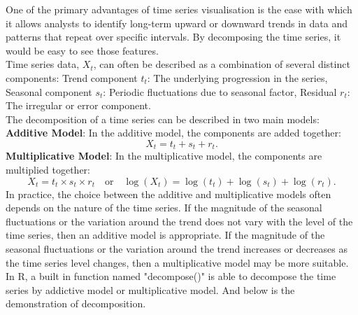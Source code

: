 \documentclass{article}\usepackage[]{graphicx}\usepackage[]{xcolor}
\begin{document}
\noindent
One of the primary advantages of time series visualisation is the ease with which it allows analysts to identify long-term upward or downward trends in data and patterns that repeat over specific intervals. By decomposing the time series, it would be easy to see those features.\\

\noindent
Time series data, $X_t$, can often be described as a combination of several distinct components: Trend component $t_t$: The underlying progression in the series, Seasonal component $s_t$: Periodic fluctuations due to seasonal factor, Residual $r_t$: The irregular or error component.\\

\noindent
The decomposition of a time series can be described in two main models:\\
\textbf{Additive Model}: In the additive model, the components are added together:
\[
X_t = t_t + s_t + r_t.
\]
\textbf{Multiplicative Model}: In the multiplicative model, the components are multiplied together:
\[
X_t = t_t \times s_t \times r_t \quad \text{or} \quad \log(X_t) = \log(t_t) + \log(s_t) + \log(r_t).
\]
In practice, the choice between the additive and multiplicative models often depends on the nature of the time series. If the magnitude of the seasonal fluctuations or the variation around the trend does not vary with the level of the time series, then an additive model is appropriate. If the magnitude of the seasonal fluctuations or the variation around the trend increases or decreases as the time series level changes, then a multiplicative model may be more suitable.\\

\noindent
In R, a built in function named "decompose()" is able to decompose the time series by addictive model or multiplicative model. And below is the demonstration of decomposition.
\end{document}
